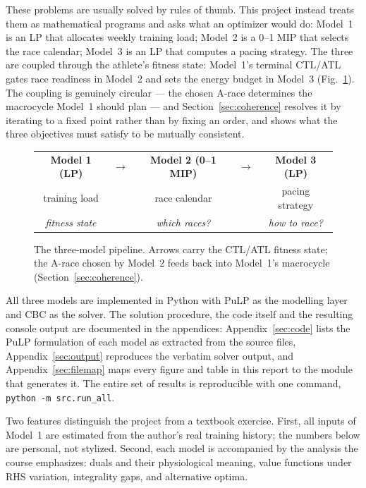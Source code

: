 \documentclass[11pt,a4paper]{article}
\begin{document}
These problems are usually solved by rules of thumb. This project instead treats
them as mathematical programs and asks what an optimizer would do: Model~1 is an
LP that allocates weekly training load; Model~2 is a 0--1 MIP that selects the race
calendar; Model~3 is an LP that computes a pacing strategy. The three are
coupled through the athlete's fitness state: Model~1's terminal CTL/ATL gates
race readiness in Model~2 and sets the energy budget in Model~3
(Fig.~\ref{fig:pipeline}). The coupling is genuinely circular --- the chosen
A-race determines the macrocycle Model~1 should plan --- and
Section~\ref{sec:coherence} resolves it by iterating to a fixed point rather
than by fixing an order, and shows what the three objectives must satisfy to
be mutually consistent.

\begin{figure}[h]
\centering
\begin{tabular}{ccccc}
\textbf{Model 1 (LP)} & $\longrightarrow$ & \textbf{Model 2 (0--1 MIP)} & $\longrightarrow$ & \textbf{Model 3 (LP)}\\
training load & & race calendar & & pacing strategy\\
\emph{fitness state} & & \emph{which races?} & & \emph{how to race?}
\end{tabular}
\caption{The three-model pipeline. Arrows carry the CTL/ATL fitness state; the
A-race chosen by Model~2 feeds back into Model~1's macrocycle
(Section~\ref{sec:coherence}).}
\label{fig:pipeline}
\end{figure}

All three models are implemented in Python with PuLP as the modelling layer and
CBC as the solver. The solution procedure, the code itself and the resulting
console output are documented in the appendices: Appendix~\ref{sec:code} lists
the PuLP formulation of each model as extracted from the source files,
Appendix~\ref{sec:output} reproduces the verbatim solver output, and
Appendix~\ref{sec:filemap} maps every figure and table in this report to the
module that generates it. The entire set of results is reproducible with one
command, \texttt{python -m src.run\_all}.

Two features distinguish the project from a textbook exercise. First, all inputs of
Model~1 are estimated from the author's real training history; the numbers below
are personal, not stylized. Second, each model is accompanied by the analysis the
course emphasizes: duals and their physiological meaning, value functions under
RHS variation, integrality gaps, and alternative optima.
\end{document}
